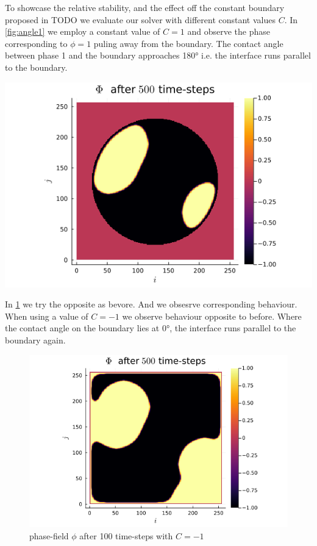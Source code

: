\documentclass{mimosis}
\begin{document}
To showcase the relative stability, and the effect off the constant boundary proposed in TODO we evaluate our solver with different constant values \(C\). In \ref{fig:angle1} we employ a constant value of \(C=1\) and observe the phase corresponding to \(\phi = 1\) puling away from the boundary. The contact angle between phase 1 and the boundary approaches 180° i.e. the interface runs parallel to the boundary.
\begin{center}
\includegraphics[width=.9\linewidth]{images/angle1.png}
\label{fig:angle1}
\end{center}


In \ref{fig:angle-1} we try the opposite as bevore. And we obsesrve corresponding behaviour. When using a value of \(C=-1\) we observe behaviour opposite to before. Where the contact angle on the boundary lies at 0°, the interface runs parallel to the boundary again.
\begin{figure}[htbp]
\centering
\includegraphics[width=.9\linewidth]{images/angle-.png}
\caption{\label{fig:angle-1}phase-field \(\phi\) after 100 time-steps with \(C=-1\)}
\end{figure}
\end{document}
